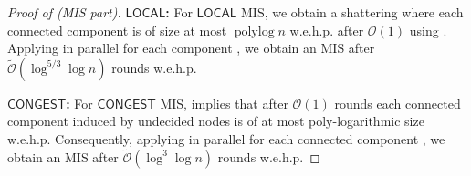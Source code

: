 \documentclass[letterpaper,11pt]{article}
\newcommand{\wehp}{w.e.h.p.\xspace}
\newcommand{\1}{\mathbb I}
\newcommand{\bigO}{\mathcal{O}}
\DeclareMathOperator{\polylog}{polylog}
\newcommand{\CONGEST}{\ensuremath{\mathsf{CONGEST}}\xspace}
\newcommand{\LOCAL}{\ensuremath{\mathsf{LOCAL}}\xspace}
\begin{document}
%
\begin{proof}[Proof of  (MIS part)]
    \textbf{\LOCAL:} For \LOCAL MIS, we obtain a shattering where each connected component is of size at most $\polylog n$ \wehp after $\bigO(1)$ using . Applying in parallel for each component \cite[Theorem 3.1]{GG24}, we obtain an MIS after $\tilde{\bigO}(\log^{5/3}\log n)$ rounds \wehp 

\smallskip

    \textbf{\CONGEST:} For \CONGEST MIS,  implies that after $\bigO(1)$ rounds each connected component induced by undecided nodes is of at most poly-logarithmic size \wehp  Consequently, applying in parallel for each connected component \cite[Theorem 1.1]{fggkr-soda-23}, we obtain an MIS after $\tilde{\bigO}(\log^{3}\log n)$ rounds \wehp 
\end{proof}
%
\end{document}
